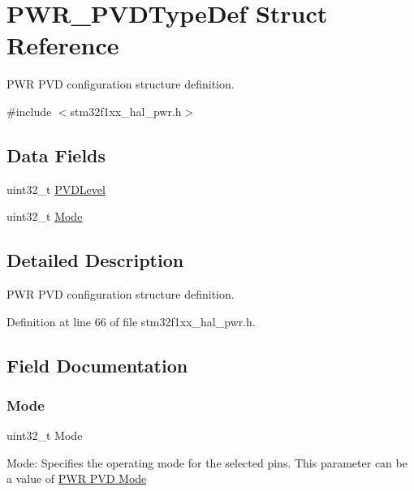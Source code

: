 \hypertarget{struct_p_w_r___p_v_d_type_def}{}\section{P\+W\+R\+\_\+\+P\+V\+D\+Type\+Def Struct Reference}
\label{struct_p_w_r___p_v_d_type_def}


P\+WR P\+VD configuration structure definition.  




{\ttfamily \#include $<$stm32f1xx\+\_\+hal\+\_\+pwr.\+h$>$}

\subsection*{Data Fields}
\begin{DoxyCompactItemize}
\item 
uint32\+\_\+t \hyperlink{struct_p_w_r___p_v_d_type_def_abf0db5c2b84ba24ffeedab5cf06bad31}{P\+V\+D\+Level}
\item 
uint32\+\_\+t \hyperlink{struct_p_w_r___p_v_d_type_def_a0ffc93ec511ed9cf1663f6939bd3e839}{Mode}
\end{DoxyCompactItemize}


\subsection{Detailed Description}
P\+WR P\+VD configuration structure definition. 

Definition at line 66 of file stm32f1xx\+\_\+hal\+\_\+pwr.\+h.



\subsection{Field Documentation}
\mbox{\label{struct_p_w_r___p_v_d_type_def_a0ffc93ec511ed9cf1663f6939bd3e839}} 
\subsubsection{\texorpdfstring{Mode}{Mode}}
{\footnotesize\ttfamily uint32\+\_\+t Mode}

Mode\+: Specifies the operating mode for the selected pins. This parameter can be a value of \hyperlink{group___p_w_r___p_v_d___mode}{P\+WR P\+VD Mode} 


